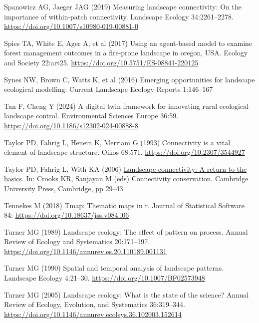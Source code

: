 \documentclass[
  10pt,
  a4paperpaper,
]{article}
\newlength{\cslhangindent}
\newenvironment{CSLReferences}[2] %
 {\begin{list}{}{%
  \setlength{\itemindent}{0pt}
  \setlength{\leftmargin}{0pt}
  \setlength{\parsep}{0pt}
  \ifodd #1
   \setlength{\leftmargin}{\cslhangindent}
   \setlength{\itemindent}{-1\cslhangindent}
  \fi
  \setlength{\itemsep}{#2\baselineskip}}}
 {\end{list}}
\begin{document}
\begin{CSLReferences}{1}{1}
Spanowicz AG, Jaeger JAG (2019) Measuring landscape connectivity: On the
importance of within-patch connectivity. Landscape Ecology
34:2261--2278. \url{https://doi.org/10.1007/s10980-019-00881-0}

Spies TA, White E, Ager A, et al (2017) Using an agent-based model to
examine forest management outcomes in a fire-prone landscape in oregon,
USA. Ecology and Society 22:art25.
\url{https://doi.org/10.5751/ES-08841-220125}

Synes NW, Brown C, Watts K, et al (2016) Emerging opportunities for
landscape ecological modelling. Current Landscape Ecology Reports
1:146--167

Tan F, Cheng Y (2024) A digital twin framework for innovating rural
ecological landscape control. Environmental Sciences Europe 36:59.
\url{https://doi.org/10.1186/s12302-024-00888-8}

Taylor PD, Fahrig L, Henein K, Merriam G (1993) Connectivity is a vital
element of landscape structure. Oikos 68:571.
\url{https://doi.org/10.2307/3544927}

Taylor PD, Fahrig L, With KA (2006)
\href{https://doi.org/10.1017/CBO9780511754821}{Landscape connectivity:
A return to the basics}. In: Crooks KR, Sanjayan M (eds) Connectivity
conservation. Cambridge University Press, Cambridge, pp 29--43

Tennekes M (2018) Tmap: Thematic maps in r. Journal of Statistical
Software 84: \url{https://doi.org/10.18637/jss.v084.i06}

Turner MG (1989) Landscape ecology: The effect of pattern on process.
Annual Review of Ecology and Systematics 20:171--197.
\url{https://doi.org/10.1146/annurev.es.20.110189.001131}

Turner MG (1990) Spatial and temporal analysis of landscape patterns.
Landscape Ecology 4:21--30. \url{https://doi.org/10.1007/BF02573948}

Turner MG (2005) Landscape ecology: What is the state of the science?
Annual Review of Ecology, Evolution, and Systematics 36:319--344.
\url{https://doi.org/10.1146/annurev.ecolsys.36.102003.152614}


\end{CSLReferences}
\end{document}
